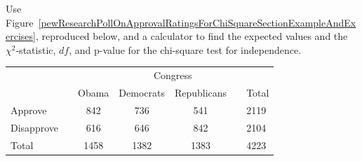 \begin{exercisewrap}
\begin{nexercise}
Use Figure~\ref{pewResearchPollOnApprovalRatingsForChiSquareSectionExampleAndExercises}, reproduced below, and a calculator to find the expected values and the $\chi^2$-statistic, $df$, and p-value for the chi-square test for independence.\footnotemark

\begin{center}
\begin{tabular}{ll ccc ll}
& & & \multicolumn{2}{c}{Congress} & \\
\cline{4-5}
 & \hspace{1mm} & Obama & Democrats & Republicans & \hspace{1mm} & Total \\
\hline
Approve				   & & 842    & 736 & 541   & 				& 2119 \\
Disapprove			   & & 616    & 646 & 842   &				& 2104 \\
\hline
Total					   & & 1458    & 1382 & 1383 & 				& 4223 \\
\hline
\end{tabular}
\end{center}
\end{nexercise}
\end{exercisewrap}



 
\D{\newpage}

